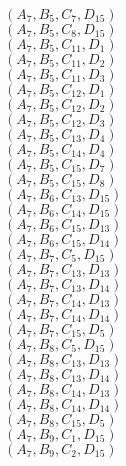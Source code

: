 \documentclass[14pt]{article}
\begin{document}
    $({A}_{7}, {B}_{5}, {C}_{7}, {D}_{15}) $ \\ 
    $({A}_{7}, {B}_{5}, {C}_{8}, {D}_{15}) $ \\ 
    $({A}_{7}, {B}_{5}, {C}_{11}, {D}_{1}) $ \\ 
    $({A}_{7}, {B}_{5}, {C}_{11}, {D}_{2}) $ \\ 
    $({A}_{7}, {B}_{5}, {C}_{11}, {D}_{3}) $ \\ 
    $({A}_{7}, {B}_{5}, {C}_{12}, {D}_{1}) $ \\ 
    $({A}_{7}, {B}_{5}, {C}_{12}, {D}_{2}) $ \\ 
    $({A}_{7}, {B}_{5}, {C}_{12}, {D}_{3}) $ \\ 
    $({A}_{7}, {B}_{5}, {C}_{13}, {D}_{4}) $ \\ 
    $({A}_{7}, {B}_{5}, {C}_{14}, {D}_{4}) $ \\ 
    $({A}_{7}, {B}_{5}, {C}_{15}, {D}_{7}) $ \\ 
    $({A}_{7}, {B}_{5}, {C}_{15}, {D}_{8}) $ \\ 
    $({A}_{7}, {B}_{6}, {C}_{13}, {D}_{15}) $ \\ 
    $({A}_{7}, {B}_{6}, {C}_{14}, {D}_{15}) $ \\ 
    $({A}_{7}, {B}_{6}, {C}_{15}, {D}_{13}) $ \\ 
    $({A}_{7}, {B}_{6}, {C}_{15}, {D}_{14}) $ \\ 
    $({A}_{7}, {B}_{7}, {C}_{5}, {D}_{15}) $ \\ 
    $({A}_{7}, {B}_{7}, {C}_{13}, {D}_{13}) $ \\ 
    $({A}_{7}, {B}_{7}, {C}_{13}, {D}_{14}) $ \\ 
    $({A}_{7}, {B}_{7}, {C}_{14}, {D}_{13}) $ \\ 
    $({A}_{7}, {B}_{7}, {C}_{14}, {D}_{14}) $ \\ 
    $({A}_{7}, {B}_{7}, {C}_{15}, {D}_{5}) $ \\ 
    $({A}_{7}, {B}_{8}, {C}_{5}, {D}_{15}) $ \\ 
    $({A}_{7}, {B}_{8}, {C}_{13}, {D}_{13}) $ \\ 
    $({A}_{7}, {B}_{8}, {C}_{13}, {D}_{14}) $ \\ 
    $({A}_{7}, {B}_{8}, {C}_{14}, {D}_{13}) $ \\ 
    $({A}_{7}, {B}_{8}, {C}_{14}, {D}_{14}) $ \\ 
    $({A}_{7}, {B}_{8}, {C}_{15}, {D}_{5}) $ \\ 
    $({A}_{7}, {B}_{9}, {C}_{1}, {D}_{15}) $ \\ 
    $({A}_{7}, {B}_{9}, {C}_{2}, {D}_{15}) $ \\ 
\end{document}
